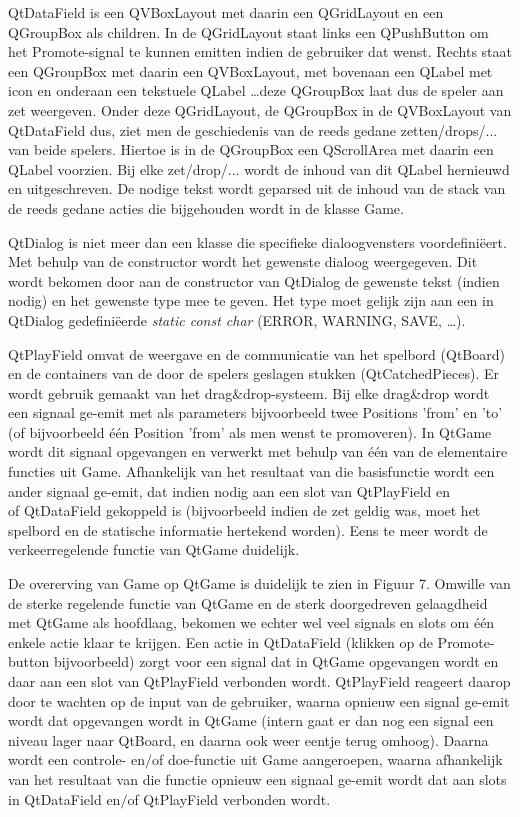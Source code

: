 \documentclass[a4paper,11pt,oneside, titlepage]{article}
\begin{document}
QtDataField is een QVBoxLayout met daarin een QGridLayout en een QGroupBox als children. In de QGridLayout staat links een QPushButton om het Promote-signal te kunnen emitten indien de gebruiker dat wenst. Rechts staat een QGroupBox met daarin een QVBoxLayout, met bovenaan een QLabel met icon en onderaan een tekstuele QLabel \ldots deze QGroupBox laat dus de speler aan zet weergeven. Onder deze QGridLayout, de QGroupBox in de QVBoxLayout van QtDataField dus, ziet men de geschiedenis van de reeds gedane zetten/drops/... van beide spelers. Hiertoe is in de QGroupBox een QScrollArea met daarin een QLabel voorzien. Bij elke zet/drop/... wordt de inhoud van dit QLabel hernieuwd en uitgeschreven. De nodige tekst wordt geparsed uit de inhoud van de stack van de reeds gedane acties die bijgehouden wordt in de klasse Game.

QtDialog is niet meer dan een klasse die specifieke dialoogvensters voordefini\"eert. Met behulp van de constructor wordt het gewenste dialoog weergegeven. Dit wordt bekomen door aan de constructor van QtDialog de gewenste tekst (indien nodig) en het gewenste type mee te geven. Het type moet gelijk zijn aan een in QtDialog gedefini\"eerde \emph{static const char} (ERROR, WARNING, SAVE, \ldots).

QtPlayField omvat de weergave en de communicatie van het spelbord (QtBoard) en de containers van de door de spelers geslagen stukken (QtCatchedPieces). Er wordt gebruik gemaakt van het drag\&drop-systeem. Bij elke drag\&drop wordt een signaal ge-emit met als parameters bijvoorbeeld twee Positions 'from' en 'to' (of bijvoorbeeld \'e\'en Position 'from' als men wenst te promoveren). In QtGame wordt dit signaal opgevangen en verwerkt met behulp van \'e\'en van de elementaire functies uit Game. Afhankelijk van het resultaat van die basisfunctie wordt een ander signaal ge-emit, dat indien nodig aan een slot van QtPlayField en\\of QtDataField gekoppeld is (bijvoorbeeld indien de zet geldig was, moet het spelbord en de statische informatie hertekend worden). Eens te meer wordt de verkeerregelende functie van QtGame duidelijk.

De overerving van Game op QtGame is duidelijk te zien in Figuur 7. Omwille van de sterke regelende functie van QtGame en de sterk doorgedreven gelaagdheid met QtGame als hoofdlaag, bekomen we echter wel veel signals en slots om \'e\'en enkele actie klaar te krijgen. Een actie in QtDataField (klikken op de Promote-button bijvoorbeeld) zorgt voor een signal dat in QtGame opgevangen wordt en daar aan een slot van QtPlayField verbonden wordt. QtPlayField reageert daarop door te wachten op de input van de gebruiker, waarna opnieuw een signal ge-emit wordt dat opgevangen wordt in QtGame (intern gaat er dan nog een signal een niveau lager naar QtBoard, en daarna ook weer eentje terug omhoog). Daarna wordt een controle- en$/$of doe-functie uit Game aangeroepen, waarna afhankelijk van het resultaat van die functie opnieuw een signaal ge-emit wordt dat aan slots in QtDataField en$/$of QtPlayField verbonden wordt.
\newpage
\end{document}
